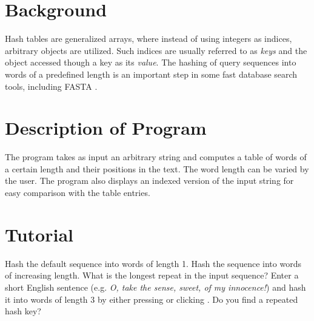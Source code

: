\section{Background}
Hash tables are generalized arrays, where instead of using integers as
indices, arbitrary objects are utilized. Such indices
are usually referred to as \textit{keys} and the object accessed though a key
as its \textit{value}. The hashing of query sequences into words of a
predefined length is an important step in some fast database search
tools, including FASTA \cite{pea88:imp}.


\section{Description of Program}
The program takes as input an arbitrary string and computes a table of
words of a certain length and their positions in the text. The word
length can be varied by the user. The program also
displays an indexed version of the input string for easy comparison
with the table entries.

\section{Tutorial}
\begin{itemize}
  \I Hash the default sequence into words of length 1.
  \I Hash the sequence into words of increasing length. What is the
  longest repeat in the input sequence?
  \I Enter a short English sentence (e.g. \textit{O, take the sense,
  sweet, of my innocence!}) and hash it into words of length 3
  by either pressing
   or clicking \ty{>}. Do you find a repeated hash key?
\end{itemize}







